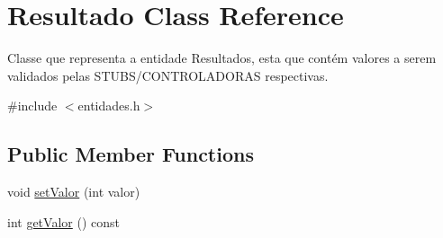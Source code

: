 \hypertarget{classResultado}{}\section{Resultado Class Reference}
\label{classResultado}


Classe que representa a entidade Resultados, esta que contém valores a serem validados pelas S\+T\+U\+B\+S/\+C\+O\+N\+T\+R\+O\+L\+A\+D\+O\+R\+AS respectivas.  




{\ttfamily \#include $<$entidades.\+h$>$}

\subsection*{Public Member Functions}
\begin{DoxyCompactItemize}
\item 
void \hyperlink{classResultado_ab0c3c0ed280eefb95e89d90dc7e239e2}{set\+Valor} (int valor)
\item 
int \hyperlink{classResultado_a029dc1436d6ed7963b5b90400e972e15}{get\+Valor} () const
\end{DoxyCompactItemize}
